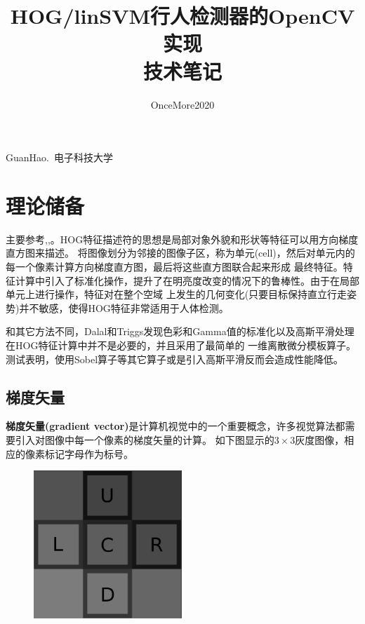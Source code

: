 \documentclass[10pt,technote,onecolumn,twoside]{IEEEtran}
\begin{document}
\title{HOG/linSVM行人检测器的OpenCV实现\\技术笔记}
\author{OnceMore2020}

%
{GuanHao.~电子科技大学}


\maketitle
\IEEEdisplaynontitleabstractindextext

\section{理论储备}
主要参考\cite{bib1},\cite{bib3},\cite{bib4}。HOG特征描述符的思想是局部对象外貌和形状等特征可以用方向梯度直方图来描述。
将图像划分为邻接的图像子区，称为单元(cell)，然后对单元内的每一个像素计算方向梯度直方图，最后将这些直方图联合起来形成
最终特征。特征计算中引入了标准化操作，提升了在明亮度改变的情况下的鲁棒性。由于在局部单元上进行操作，特征对在整个空域
上发生的几何变化(只要目标保持直立行走姿势)并不敏感，使得HOG特征非常适用于人体检测。

和其它方法不同，Dalal和Triggs发现色彩和Gamma值的标准化以及高斯平滑处理在HOG特征计算中并不是必要的，并且采用了最简单的
一维离散微分模板算子。测试表明，使用Sobel算子等其它算子或是引入高斯平滑反而会造成性能降低。

\subsection{梯度矢量}
\textbf{梯度矢量(gradient vector)}是计算机视觉中的一个重要概念，许多视觉算法都需要引入对图像中每一个像素的梯度矢量的计算。
如下图显示的$3\times3$灰度图像，相应的像素标记字母作为标号。
\begin{figure}[htbp]
\centering
\includegraphics[width=2.2in]{gradient-3.png}
\end{figure}
\end{document}
